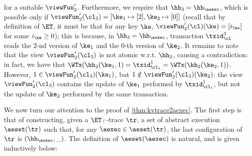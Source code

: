 \begin{example}
for a suitable $\viewFun_2'$.
Furthermore, we require that $\hh_3 = \hh_{\aexec}$, which is possible only if $\viewFun_2'(\cl_3) = [\ke_1 \mapsto [2], \ke_2 \mapsto [0] ]$ 
(recall that by definition of $\ET$, it must be that for any key $\ke$, $\viewFun_2'(\cl)(\ke) = [i_{\ke}]$ for some $i_{\ke} \geq 0$); 
this is because, in $\hh_3 = \hh_{\aexec}$, transaction $\txid_{\cl}^3$ reads the $2$-nd version of $\ke_1$ and the $0$-th version of 
$\ke_2$. It remains to note that the view $\viewFun_{2}'(\cl_3)$ is not atomic w.r.t. $\hh_2$, causing a contradiction: 
in fact, we have that $\WTx(\hh_{2}(\ke_1, 1) = \txid_{\cl_1}^{1} = \WTx(\hh_2(\ke_2, 1))$. However, 
$1 \in \viewFun_{2}'(\cl_3)(\ke_1)$, but $1 \notin \viewFun_{2}'(\cl_3)(\ke_2)$: the view $\viewFun_{2}'(\cl_3)$ 
contains the update of $\ke_1$ performed by $\txid_{\cl_1}^{1}$, but not the update of $\ke_2$ performed by the 
same transaction.
\end{example}

We now turn our attention to the proof of \cref{thm:kvtrace2aexec}. 
The first step is that of constructing, given a $\ET_{\top}$-trace $\tr$, 
a set of abstract execution $\aeset(\tr)$ such that, for any $\aexec \in \aeset(\tr)$, 
the last configuration of $\tr$ is $(\hh_{\aexec}, \_)$. 
The definition of $\aeset(\aexec)$ is natural, and is given inductively below: 

